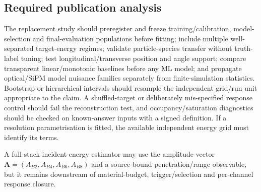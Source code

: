 
\subsection{Required publication analysis}

The replacement study should preregister and freeze training/calibration, model-selection and final-evaluation populations before fitting; include multiple well-separated target-energy regimes; validate particle-species transfer without truth-label tuning; test longitudinal/transverse position and angle support; compare transparent linear/monotonic baselines before any ML model; and propagate optical/SiPM model nuisance families separately from finite-simulation statistics. Bootstrap or hierarchical intervals should resample the independent grid/run unit appropriate to the claim. A shuffled-target or deliberately mis-specified response control should fail the reconstruction test, and occupancy/saturation diagnostics should be checked on known-answer inputs with a signed definition. If a resolution parametrisation is fitted, the available independent energy grid must identify its terms.

A full-stack incident-energy estimator may use the amplitude vector \(\mathbf A=(A_{B2},A_{B4},A_{B6},A_{B8})\) and a source-bound penetration/range observable, but it remains downstream of material-budget, trigger/selection and per-channel response closure.
